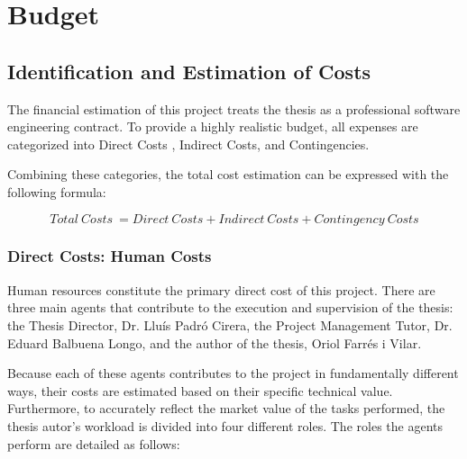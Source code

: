 \section{Budget}
\label{sec:budget}

\subsection{Identification and Estimation of Costs}
\label{subsec:identification-estimation-costs}

The financial estimation of this project treats the thesis as a professional software engineering contract. To provide a highly realistic budget, all expenses are categorized into Direct Costs , Indirect Costs, and Contingencies.

Combining these categories, the total cost estimation can be expressed with the following formula:

\begin{equation}
Total\ Costs\ = Direct\ Costs + Indirect\ Costs + Contingency\ Costs
\end{equation}

\subsubsection{Direct Costs: Human Costs}
\label{subsubsec:direct-costs-human-costs}

Human resources constitute the primary direct cost of this project. There are three main agents that contribute to the execution and supervision of the thesis: the Thesis Director, Dr. Lluís Padró Cirera, the Project Management Tutor, Dr. Eduard Balbuena Longo, and the author of the thesis, Oriol Farrés i Vilar. 

Because each of these agents contributes to the project in fundamentally different ways, their costs are estimated based on their specific technical value. Furthermore, to accurately reflect the market value of the tasks performed, the thesis autor's workload is divided into four different roles. The roles the agents perform are detailed as follows:

